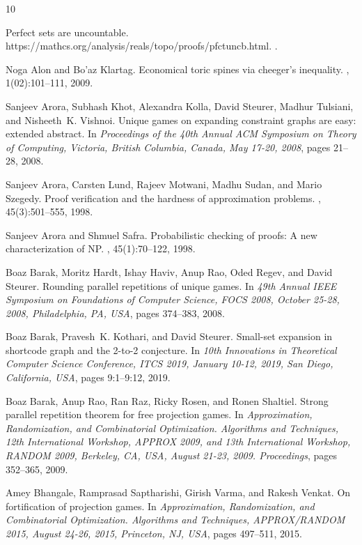 \documentclass[10pt,a4paper]{article}
\begin{document}
\begin{thebibliography}{10}

Perfect sets are uncountable.
\newblock https://mathcs.org/analysis/reals/topo/proofs/pfctuncb.html.
.

Noga Alon and Bo'az Klartag.
\newblock Economical toric spines via cheeger's inequality.
, 1(02):101--111, 2009.

Sanjeev Arora, Subhash Khot, Alexandra Kolla, David Steurer, Madhur Tulsiani,
  and Nisheeth~K. Vishnoi.
\newblock Unique games on expanding constraint graphs are easy: extended
  abstract.
\newblock In {\em Proceedings of the 40th Annual {ACM} Symposium on Theory of
  Computing, Victoria, British Columbia, Canada, May 17-20, 2008}, pages
  21--28, 2008.

Sanjeev Arora, Carsten Lund, Rajeev Motwani, Madhu Sudan, and Mario Szegedy.
\newblock Proof verification and the hardness of approximation problems.
, 45(3):501--555, 1998.

Sanjeev Arora and Shmuel Safra.
\newblock Probabilistic checking of proofs: {A} new characterization of {NP}.
, 45(1):70--122, 1998.

Boaz Barak, Moritz Hardt, Ishay Haviv, Anup Rao, Oded Regev, and David Steurer.
\newblock Rounding parallel repetitions of unique games.
\newblock In {\em 49th Annual {IEEE} Symposium on Foundations of Computer
  Science, {FOCS} 2008, October 25-28, 2008, Philadelphia, PA, {USA}}, pages
  374--383, 2008.

Boaz Barak, Pravesh~K. Kothari, and David Steurer.
\newblock Small-set expansion in shortcode graph and the 2-to-2 conjecture.
\newblock In {\em 10th Innovations in Theoretical Computer Science Conference,
  {ITCS} 2019, January 10-12, 2019, San Diego, California, {USA}}, pages
  9:1--9:12, 2019.

Boaz Barak, Anup Rao, Ran Raz, Ricky Rosen, and Ronen Shaltiel.
\newblock Strong parallel repetition theorem for free projection games.
\newblock In {\em Approximation, Randomization, and Combinatorial Optimization.
  Algorithms and Techniques, 12th International Workshop, {APPROX} 2009, and
  13th International Workshop, {RANDOM} 2009, Berkeley, CA, USA, August 21-23,
  2009. Proceedings}, pages 352--365, 2009.

Amey Bhangale, Ramprasad Saptharishi, Girish Varma, and Rakesh Venkat.
\newblock On fortification of projection games.
\newblock In {\em Approximation, Randomization, and Combinatorial Optimization.
  Algorithms and Techniques, {APPROX/RANDOM} 2015, August 24-26, 2015,
  Princeton, NJ, {USA}}, pages 497--511, 2015.


\end{thebibliography}
\end{document}
